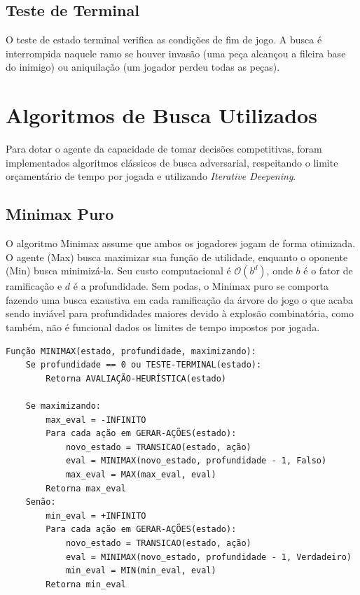 \documentclass[12pt,a4paper]{article}
\begin{document}
\subsection{Teste de Terminal}
O teste de estado terminal verifica as condições de fim de jogo. A busca é interrompida naquele ramo se houver invasão 
(uma peça alcançou a fileira base do inimigo) ou aniquilação (um jogador perdeu todas as peças).

\section{Algoritmos de Busca Utilizados}

Para dotar o agente da capacidade de tomar decisões competitivas, foram implementados algoritmos clássicos 
de busca adversarial, respeitando o limite orçamentário de tempo por jogada e utilizando \textit{Iterative Deepening}.

\subsection{Minimax Puro}
O algoritmo Minimax assume que ambos os jogadores jogam de forma otimizada. O agente (Max) busca maximizar 
sua função de utilidade, enquanto o oponente (Min) busca minimizá-la. Seu custo computacional é $\mathcal{O}(b^d)$, 
onde $b$ é o fator de ramificação e $d$ é a profundidade. Sem podas, o Minimax puro se comporta fazendo uma busca 
exaustiva em cada ramificação da árvore do jogo o que acaba sendo inviável para profundidades maiores devido à explosão combinatória, como
também, não é funcional dados os limites de tempo impostos por jogada.

\begin{verbatim}
Função MINIMAX(estado, profundidade, maximizando):
    Se profundidade == 0 ou TESTE-TERMINAL(estado):
        Retorna AVALIAÇÃO-HEURÍSTICA(estado)
        
    Se maximizando:
        max_eval = -INFINITO
        Para cada ação em GERAR-AÇÕES(estado):
            novo_estado = TRANSICAO(estado, ação)
            eval = MINIMAX(novo_estado, profundidade - 1, Falso)
            max_eval = MAX(max_eval, eval)
        Retorna max_eval
    Senão:
        min_eval = +INFINITO
        Para cada ação em GERAR-AÇÕES(estado):
            novo_estado = TRANSICAO(estado, ação)
            eval = MINIMAX(novo_estado, profundidade - 1, Verdadeiro)
            min_eval = MIN(min_eval, eval)
        Retorna min_eval
\end{verbatim}
\end{document}
